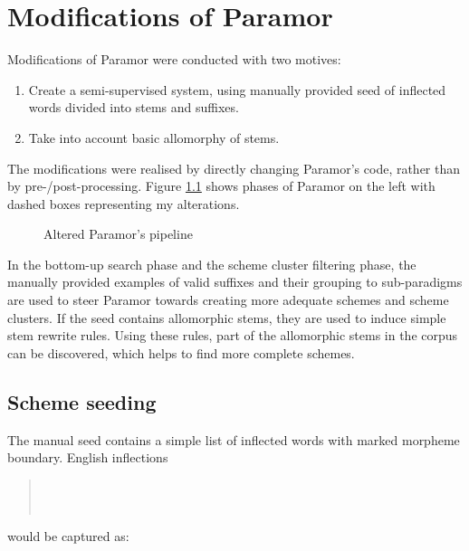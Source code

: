 \chapter{Modifications of Paramor}\label{chapter:modifications}

Modifications of Paramor were conducted with two motives: 
\begin{enumerate}
\item Create a semi-supervised system, using manually provided seed of inflected words divided into stems and suffixes.

\item Take into account basic allomorphy of stems.
\end{enumerate} 
\noindent The modifications were realised by directly changing Paramor's code, rather than by pre-/post-processing. Figure \ref{fig:overview} shows phases of Paramor on the left with dashed boxes representing my alterations.

\begin{figure}
\begin{center}

\end{center}
\caption{Altered Paramor's pipeline}
\label{fig:overview}
\end{figure}

In the bottom-up search phase and the scheme cluster filtering phase, the manually provided examples of valid suffixes and their grouping to sub-paradigms are used to steer Paramor towards creating more adequate schemes and scheme clusters. 
If the seed contains allomorphic stems, they are used to induce simple stem rewrite rules. Using these rules, part of the allomorphic stems in the corpus can be discovered, which helps to find more complete schemes.

\section{Scheme seeding}

\noindent
The manual seed contains a simple list of inflected words with marked morpheme boundary. English inflections
\begin{quote}
\\
\\
\end{quote}

\noindent
would be captured as:

\begin{quote}
\end{quote}

